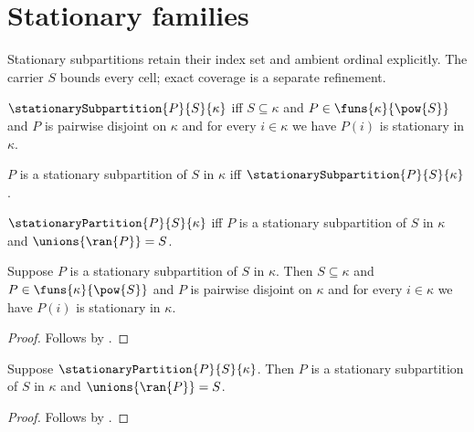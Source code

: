 \section{Stationary families}





Stationary subpartitions retain their index set and ambient ordinal explicitly.
The carrier $S$ bounds every cell; exact coverage is a separate refinement.

\begin{definition}\label{stationary_subpartition}
    $\stationarySubpartition{P}{S}{\kappa}$ iff
        $S\subseteq\kappa$ and
        $P\in\funs{\kappa}{\pow{S}}$ and
        $P$ is pairwise disjoint on $\kappa$ and
        for every $i\in\kappa$ we have
            $P(i)$ is stationary in $\kappa$.
\end{definition}

\begin{abbreviation}\label{stationary_subpartition_phrase}
    $P$ is a stationary subpartition of $S$ in $\kappa$ iff
        $\stationarySubpartition{P}{S}{\kappa}$.
\end{abbreviation}

\begin{definition}\label{stationary_partition}
    $\stationaryPartition{P}{S}{\kappa}$ iff
        $P$ is a stationary subpartition of $S$ in $\kappa$ and
        $\unions{\ran{P}}=S$.
\end{definition}

\begin{proposition}\label{stationary_subpartition_elim}
    Suppose $P$ is a stationary subpartition of $S$ in $\kappa$.
    Then $S\subseteq\kappa$ and
        $P\in\funs{\kappa}{\pow{S}}$ and
        $P$ is pairwise disjoint on $\kappa$ and
        for every $i\in\kappa$ we have
            $P(i)$ is stationary in $\kappa$.
\end{proposition}
\begin{proof}
    Follows by .
\end{proof}

\begin{proposition}\label{stationary_partition_elim}
    Suppose $\stationaryPartition{P}{S}{\kappa}$.
    Then $P$ is a stationary subpartition of $S$ in $\kappa$ and
        $\unions{\ran{P}}=S$.
\end{proposition}
\begin{proof}
    Follows by .
\end{proof}

